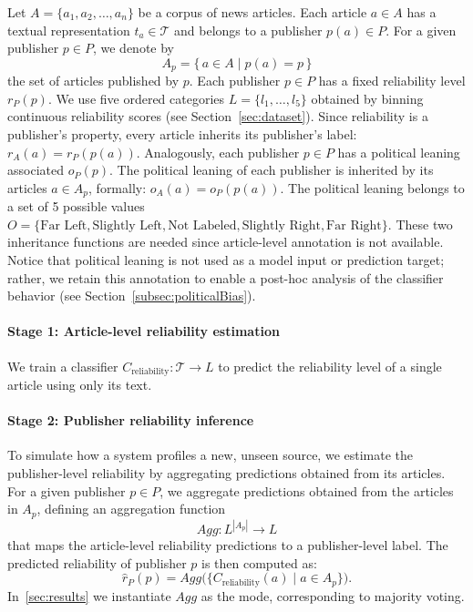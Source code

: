 \documentclass[journal]{IEEEtran}
\begin{document}
Let \(A = \{a_1, a_2, \ldots, a_n\}\) be a corpus of news articles. Each article \(a \in A\) has a textual representation \(t_a \in \mathcal{T}\) and belongs to a publisher \(p(a) \in P\). 
For a given publisher \(p \in P\), we denote by
\[
A_p = \{\, a \in A \mid p(a) = p \,\}
\]
the set of articles published by \(p\).
Each publisher \(p \in P\) has a fixed reliability level \(r_P(p)\). We use five ordered categories \(L = \{l_1, \ldots, l_5\}\) obtained by binning continuous reliability scores (see Section~\ref{sec:dataset}). Since reliability is a publisher's property, every article inherits its publisher's label: \(r_A(a) = r_P(p(a))\).
Analogously, each publisher \(p \in P\) has a political leaning associated \(o_P(p)\). 
The political leaning of each publisher is inherited by its articles \(a \in A_p\), formally: \(o_A(a) = o_P(p(a))\). The political leaning belongs to a set of 5 possible values \(O = \{\text{Far Left},\text{Slightly Left}, \text{Not Labeled}, \text{Slightly Right}, \text{Far Right} \}\). 
These two inheritance functions are needed since article-level annotation is not available. Notice that political leaning is not used as a model input or prediction target; rather, we retain this annotation to enable a post-hoc analysis of the classifier behavior (see Section~\ref{subsec:politicalBias}).

\paragraph{Stage 1: Article-level reliability estimation} 
We train a classifier \(C_{\text{reliability}}: \mathcal{T} \rightarrow L\) to predict the reliability level of a single article using only its text.

\paragraph{Stage 2: Publisher reliability inference} 

To simulate how a system profiles a new, unseen source, we estimate the publisher-level reliability by aggregating predictions obtained from its articles.
For a given publisher \(p \in P\), we aggregate predictions obtained from the articles in \(A_p\), defining an aggregation function
\[
Agg: L^{|A_{p}|} \rightarrow L
\]
that maps the article-level reliability predictions to a
publisher-level label.
The predicted reliability of publisher \(p\) is then computed as:
\[
\hat{r}_P(p) = Agg\big(\{ C_{\text{reliability}}(a) \mid a \in A_p \}\big).
\]
In~\ref{sec:results} we instantiate \(Agg\) as the mode, corresponding to majority voting. 
\end{document}
